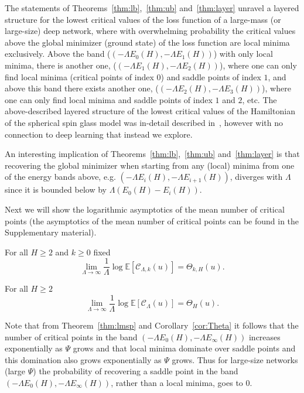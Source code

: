 \documentclass[twoside]{article}
\begin{document}
The statements of Theorems~\ref{thm:lb},~\ref{thm:ub} and~\ref{thm:layer} unravel a layered structure for the lowest critical values of the loss function of a large-mass (or large-size) deep network, where with overwhelming probability the critical values above the global minimizer (ground state) of the loss function are local minima exclusively. Above the band ($\left(-\Lambda E_0(H),-\Lambda E_1(H)\right)$) with only local minima, there is another one, ($\left(-\Lambda E_1(H),-\Lambda E_2(H)\right)$), where one can only find local minima (critical points of index $0$) and saddle points of index $1$, and above this band there exists another one, ($\left(-\Lambda E_2(H),-\Lambda E_3(H)\right)$), where one can only find local minima and saddle points of index $1$ and $2$, etc. The above-described layered structure of the lowest critical values of the Hamiltonian of the spherical spin glass model was in-detail described in~\cite{AAC2010}, however with no connection to deep learning that instead we explore. 

An interesting implication of Theorems~\ref{thm:lb},~\ref{thm:ub} and~\ref{thm:layer} is that recovering the global minimizer when starting from any (local) minima from one of the energy bands above, e.g. $\left(-\Lambda E_i(H),-\Lambda E_{i+1}(H)\right)$, diverges with $\Lambda$ since it is bounded below by $\Lambda (E_0(H) - E_i(H))$. 

Next we will show the logarithmic asymptotics of the mean number of critical points (the asymptotics of the mean number of critical points can be found in the Supplementary material).
\begin{theorem}
For all $H \geq 2$ and $k \geq 0$ fixed
\[\lim_{\Lambda \rightarrow \infty}\frac{1}{\Lambda}\log\mathbb{E}[\mathcal{C}_{\Lambda,k}(u)] = \Theta_{k,H}(u).
\]
\label{thm:lmsp}
\end{theorem}
\begin{theorem}
For all $H \geq 2$
\[\lim_{\Lambda \rightarrow \infty}\frac{1}{\Lambda}\log\mathbb{E}[\mathcal{C}_{\Lambda}(u)] = \Theta_{H}(u).
\]
\label{thm:cp}
\end{theorem}
Note that from Theorem~\ref{thm:lmsp} and Corollary~\ref{cor:Theta} it follows that the number of critical points in the band $\left(-\Lambda E_0(H),-\Lambda E_{\infty}(H)\right)$ increases exponentially as $\Psi$ grows and that local minima dominate over saddle points and this domination also grows exponentially as $\Psi$ grows. Thus for large-size networks (large $\Psi$) the probability of recovering a saddle point in the band $\left(-\Lambda E_0(H),-\Lambda E_{\infty}(H)\right)$, rather than a local minima, goes to $0$.
\end{document}
